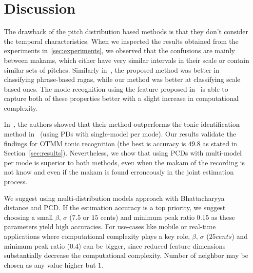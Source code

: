 \documentclass{sig-alternate}
\begin{document}

\section{Discussion}\label{sec:discussion}

The drawback of the pitch distribution based methods is that they don't consider the temporal characteristics. When we inspected the results obtained from the experiments in~\ref{sec:experiments}, we observed that the confusions are mainly between makams, which either have very similar intervals in their scale or contain similar sets of pitches. Similarly in~\cite{gulati_network}, the proposed method was better in classifying phrase-based ragas, while our method was better at classifying scale based ones. The mode recognition using the feature proposed in~\cite{gulati2016raga} is able to capture both of these properties better with a slight increase in computational complexity.

In~\cite{sercan_tonic}, the authors showed that their method outperforms the tonic identification method in~\cite{bozkurt_tonic} (using PDs with single-model per mode). Our results validate the findings for OTMM tonic recognition (the best is accuracy is $49.8$ as stated in Section~\ref{sec:results}). Nevertheless, we show that using PCDs with multi-model per mode is superior to both methods, even when the makam of the recording is not know and even if the makam is found erroneously in the joint estimation process.

We suggest using multi-distribution models approach with Bhattacharyya distance and PCD. If the estimation accuracy is a top priority, we suggest choosing a small $\beta$, $\sigma$ ($7.5$ or $15$ cents) and minimum peak ratio $0.15$ as these parameters yield high accuracies. For use-cases like mobile or real-time applications where computational complexity plays a key role, $\beta$, $\sigma$ ($25 cents$) and minimum peak ratio ($0.4$) can be bigger, since reduced feature dimensions substantially decrease the computational complexity. Number of neighbor may be chosen as any value higher but $1$.
\end{document}
